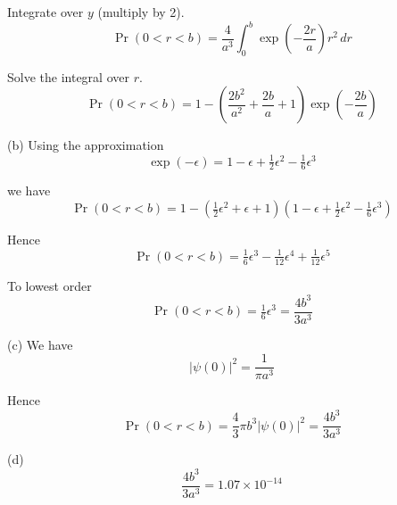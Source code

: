 Integrate over $y$ (multiply by 2).
\begin{equation*}
\Pr(0<r<b)=\frac{4}{a^3}
\int_0^b\exp\left(-\frac{2r}{a}\right)r^2\,dr
\end{equation*}

Solve the integral over $r$.
\begin{equation*}
\Pr(0<r<b)=1-\left(\frac{2b^2}{a^2}+\frac{2b}{a}+1\right)
\exp\left(-\frac{2b}{a}\right)
\tag{1}
\end{equation*}

(b) Using the approximation
\begin{equation*}
\exp(-\epsilon)=1-\epsilon+\tfrac{1}{2}\epsilon^2-\tfrac{1}{6}\epsilon^3
\end{equation*}

we have
\begin{equation*}
\Pr(0<r<b)=1-\left(\tfrac{1}{2}\epsilon^2+\epsilon+1\right)
\left(1-\epsilon+\tfrac{1}{2}\epsilon^2-\tfrac{1}{6}\epsilon^3\right)
\end{equation*}

Hence
\begin{equation*}
\Pr(0<r<b)=\tfrac{1}{6}\epsilon^3-\tfrac{1}{12}\epsilon^4+\tfrac{1}{12}\epsilon^5
\tag{2}
\end{equation*}

To lowest order
\begin{equation*}
\Pr(0<r<b)=\tfrac{1}{6}\epsilon^3=\frac{4b^3}{3a^3}
\end{equation*}

(c) We have
\begin{equation*}
|\psi(0)|^2=\frac{1}{\pi a^3}
\end{equation*}

Hence
\begin{equation*}
\Pr(0<r<b)=\frac{4}{3}\pi b^3|\psi(0)|^2=\frac{4b^3}{3a^3}
\end{equation*}

(d)
\begin{equation*}
\frac{4b^3}{3a^3}=1.07\times10^{-14}
\end{equation*}


